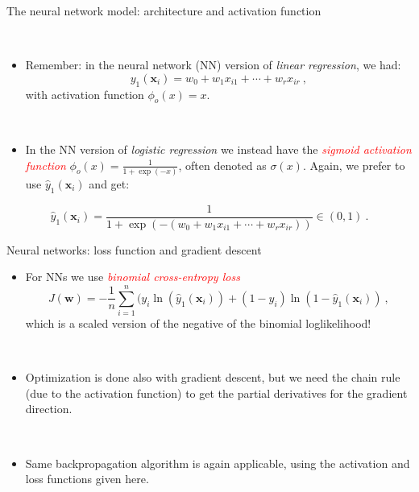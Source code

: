 \documentclass[10pt,ignorenonframetext,]{beamer}
\providecommand{\tightlist}{%
  \setlength{\itemsep}{0pt}\setlength{\parskip}{0pt}}
\begin{document}
\begin{frame}

\begin{block}{The neural network model: architecture and activation
function}

\(~\)

\begin{itemize}
\tightlist
\item
  Remember: in the neural network (NN) version of \emph{linear
  regression}, we had:
  \[ y_1({\boldsymbol x}_i)=w_0+w_1 x_{i1}+\cdots + w_r x_{ir} \ , \]
  with activation function \(\phi_o(x)=x\).
\end{itemize}

\(~\)

\begin{itemize}
\tightlist
\item
  In the NN version of \emph{logistic regression} we instead have the
  \emph{\textcolor{red}{sigmoid activation function}}
  \(\phi_o(x)=\frac{1}{1+\exp(-x)}\), often denoted as \(\sigma(x)\).
  Again, we prefer to use \(\hat{y}_1({\boldsymbol x}_i)\) and get:
\end{itemize}

\[ 
\hat{y}_1({\boldsymbol x}_i)=\frac{1}{1+\exp(-(w_0+w_1 x_{i1}+\cdots + w_r x_{ir}))} \in (0,1) \ . 
\]

\end{block}

\end{frame}

\begin{frame}

\begin{block}{Neural networks: loss function and gradient descent}

\vspace{2mm}

\begin{itemize}
\tightlist
\item
  For NNs we use \emph{\textcolor{red}{binomial cross-entropy loss}}
  \[ J({\boldsymbol w})=-\frac{1}{n}\sum_{i=1}^n (y_i\ln({\hat{y}_1({\boldsymbol x}_i)})+(1-y_i)\ln(1-{\hat{y}_1({\boldsymbol x}_i)}) \ , \]
  which is a scaled version of the negative of the binomial
  loglikelihood!
\end{itemize}

\(~\)

\begin{itemize}
\tightlist
\item
  Optimization is done also with gradient descent, but we need the chain
  rule (due to the activation function) to get the partial derivatives
  for the gradient direction.
\end{itemize}

\(~\)

\begin{itemize}
\tightlist
\item
  Same backpropagation algorithm is again applicable, using the
  activation and loss functions given here.
\end{itemize}

\end{block}

\end{frame}
\end{document}
